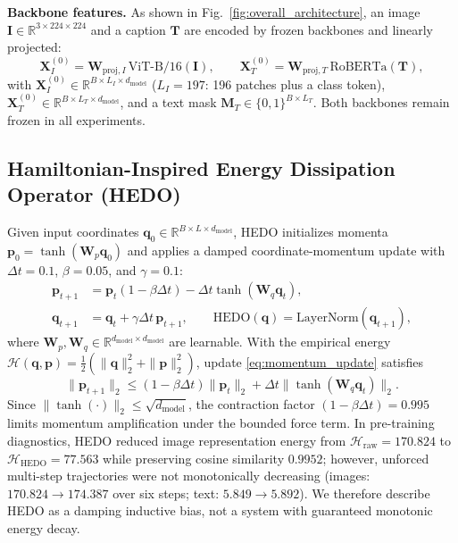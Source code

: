 \documentclass[pdflatex,sn-mathphys-num]{sn-jnl}
\begin{document}
\textbf{Backbone features.} As shown in Fig.~\ref{fig:overall_architecture}, an image $\mathbf{I} \in \mathbb{R}^{3 \times 224 \times 224}$ and a caption $\mathbf{T}$ are encoded by frozen backbones and linearly projected:
\begin{equation}
\mathbf{X}_I^{(0)} = \mathbf{W}_{\text{proj}, I} \, \text{ViT-B/16}(\mathbf{I}), \qquad \mathbf{X}_T^{(0)} = \mathbf{W}_{\text{proj}, T} \, \text{RoBERTa}(\mathbf{T}), \label{eq:backbone}
\end{equation}
with $\mathbf{X}_I^{(0)} \in \mathbb{R}^{B \times L_I \times d_{\text{model}}}$ ($L_I = 197$: 196 patches plus a class token), $\mathbf{X}_T^{(0)} \in \mathbb{R}^{B \times L_T \times d_{\text{model}}}$, and a text mask $\mathbf{M}_T \in \{0, 1\}^{B \times L_T}$. Both backbones remain frozen in all experiments.

\subsection{Hamiltonian-Inspired Energy Dissipation Operator (HEDO)}
Given input coordinates $\mathbf{q}_0 \in \mathbb{R}^{B \times L \times d_{\text{model}}}$, HEDO initializes momenta $\mathbf{p}_0 = \tanh(\mathbf{W}_p \mathbf{q}_0)$ and applies a damped coordinate-momentum update with $\Delta t = 0.1$, $\beta = 0.05$, and $\gamma = 0.1$:
\begin{align}
\mathbf{p}_{t+1} &= \mathbf{p}_t (1 - \beta \Delta t) - \Delta t \tanh(\mathbf{W}_q \mathbf{q}_t), \label{eq:momentum_update} \\
\mathbf{q}_{t+1} &= \mathbf{q}_t + \gamma \Delta t \, \mathbf{p}_{t+1}, \qquad \text{HEDO}(\mathbf{q}) = \text{LayerNorm}(\mathbf{q}_{t+1}), \label{eq:hedo}
\end{align}
where $\mathbf{W}_p, \mathbf{W}_q \in \mathbb{R}^{d_{\text{model}} \times d_{\text{model}}}$ are learnable. With the empirical energy $\mathcal{H}(\mathbf{q}, \mathbf{p}) = \frac{1}{2}(\|\mathbf{q}\|_2^2 + \|\mathbf{p}\|_2^2)$, update \eqref{eq:momentum_update} satisfies
\begin{equation}
\|\mathbf{p}_{t+1}\|_2 \le (1 - \beta \Delta t)\|\mathbf{p}_t\|_2 + \Delta t \|\tanh(\mathbf{W}_q \mathbf{q}_t)\|_2 .
\end{equation}
Since $\|\tanh(\cdot)\|_2 \le \sqrt{d_{\text{model}}}$, the contraction factor $(1 - \beta \Delta t) = 0.995$ limits momentum amplification under the bounded force term. In pre-training diagnostics, HEDO reduced image representation energy from $\mathcal{H}_{\text{raw}} = 170.824$ to $\mathcal{H}_{\text{HEDO}} = 77.563$ while preserving cosine similarity $0.9952$; however, unforced multi-step trajectories were not monotonically decreasing (images: $170.824 \to 174.387$ over six steps; text: $5.849 \to 5.892$). We therefore describe HEDO as a damping inductive bias, not a system with guaranteed monotonic energy decay.
\end{document}
